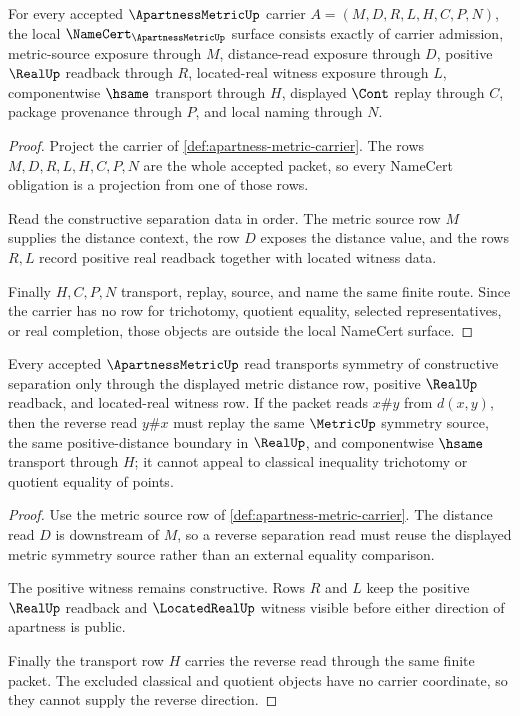 \begin{theorem}
\label{thm:apartness-metric-namecert-obligations}
For every accepted $\ApartnessMetricUp$ carrier $A=(M,D,R,L,H,C,P,N)$, the local $\NameCert_{\ApartnessMetricUp}$ surface consists exactly of carrier admission, metric-source exposure through $M$, distance-read exposure through $D$, positive $\RealUp$ readback through $R$, located-real witness exposure through $L$, componentwise $\hsame$ transport through $H$, displayed $\Cont$ replay through $C$, package provenance through $P$, and local naming through $N$.
\end{theorem}
\begin{proof}
Project the carrier of \autoref{def:apartness-metric-carrier}. The rows $M,D,R,L,H,C,P,N$ are the whole accepted packet, so every NameCert obligation is a projection from one of those rows.

Read the constructive separation data in order. The metric source row $M$ supplies the distance context, the row $D$ exposes the distance value, and the rows $R,L$ record positive real readback together with located witness data.

Finally $H,C,P,N$ transport, replay, source, and name the same finite route. Since the carrier has no row for trichotomy, quotient equality, selected representatives, or real completion, those objects are outside the local NameCert surface.
\end{proof}

\begin{theorem}
\label{thm:apartness-metric-symmetry-cotransport}
Every accepted $\ApartnessMetricUp$ read transports symmetry of constructive separation only through the displayed metric distance row, positive $\RealUp$ readback, and located-real witness row. If the packet reads $x\# y$ from $d(x,y)$, then the reverse read $y\# x$ must replay the same $\MetricUp$ symmetry source, the same positive-distance boundary in $\RealUp$, and componentwise $\hsame$ transport through $H$; it cannot appeal to classical inequality trichotomy or quotient equality of points.
\end{theorem}
\begin{proof}
Use the metric source row of \autoref{def:apartness-metric-carrier}. The distance read $D$ is downstream of $M$, so a reverse separation read must reuse the displayed metric symmetry source rather than an external equality comparison.

The positive witness remains constructive. Rows $R$ and $L$ keep the positive $\RealUp$ readback and $\LocatedRealUp$ witness visible before either direction of apartness is public.

Finally the transport row $H$ carries the reverse read through the same finite packet. The excluded classical and quotient objects have no carrier coordinate, so they cannot supply the reverse direction.
\end{proof}

